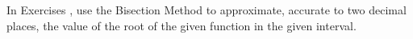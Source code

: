 {\noindent In Exercises}
{, use the Bisection Method to approximate, accurate to two decimal places, the value of the root of the given function in the given interval. }
